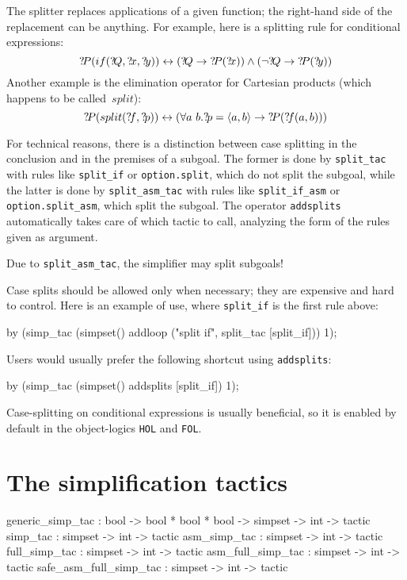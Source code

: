 The splitter replaces applications of a given function; the right-hand side
of the replacement can be anything.  For example, here is a splitting rule
for conditional expressions:
\[ \Var{P}(if(\Var{Q},\Var{x},\Var{y})) \bimp (\Var{Q} \imp \Var{P}(\Var{x}))
\conj (\neg\Var{Q} \imp \Var{P}(\Var{y})) 
\] 
Another example is the elimination operator for Cartesian products (which
happens to be called~$split$):  
\[ {?\!P}(split({?\!f},{?\!p})) \leftrightarrow (\forall a~b. {?\!p} =
\langle a,b\rangle \rightarrow {?\!P}({?\!f}(a,b))) 
\] 

For technical reasons, there is a distinction between case splitting in the 
conclusion and in the premises of a subgoal. The former is done by
\texttt{split_tac} with rules like \texttt{split_if} or \texttt{option.split}, 
which do not split the subgoal, while the latter is done by 
\texttt{split_asm_tac} with rules like \texttt{split_if_asm} or 
\texttt{option.split_asm}, which split the subgoal.
The operator \texttt{addsplits} automatically takes care of which tactic to
call, analyzing the form of the rules given as argument.
\begin{warn}
Due to \texttt{split_asm_tac}, the simplifier may split subgoals!
\end{warn}

Case splits should be allowed only when necessary; they are expensive
and hard to control.  Here is an example of use, where \texttt{split_if}
is the first rule above:
\begin{ttbox}
by (simp_tac (simpset() 
                 addloop ("split if", split_tac [split_if])) 1);
\end{ttbox}
Users would usually prefer the following shortcut using \texttt{addsplits}:
\begin{ttbox}
by (simp_tac (simpset() addsplits [split_if]) 1);
\end{ttbox}
Case-splitting on conditional expressions is usually beneficial, so it is
enabled by default in the object-logics \texttt{HOL} and \texttt{FOL}.


\section{The simplification tactics}\label{simp-tactics}
\begin{ttbox}
generic_simp_tac       : bool -> bool * bool * bool -> 
                         simpset -> int -> tactic
simp_tac               : simpset -> int -> tactic
asm_simp_tac           : simpset -> int -> tactic
full_simp_tac          : simpset -> int -> tactic
asm_full_simp_tac      : simpset -> int -> tactic
safe_asm_full_simp_tac : simpset -> int -> tactic
\end{ttbox}

